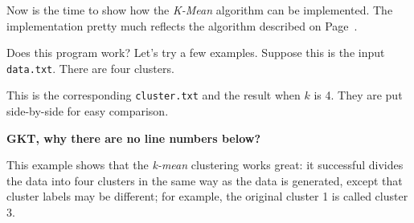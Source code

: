 Now is the time to show how the {\it K-Mean} algorithm can be
implemented. The implementation pretty much reflects the algorithm
described on Page~\pageref{algorithm:kmean}.

\resetlinenumber[1]
\linenumbers
\begin{tt}
  
\end{tt}
\nolinenumbers

\resetlinenumber[1]
\linenumbers
\begin{tt}
  
\end{tt}
\nolinenumbers

\resetlinenumber[1]
\linenumbers
\begin{tt}
  
\end{tt}
\nolinenumbers

\resetlinenumber[1]
\linenumbers
\begin{tt}
  
\end{tt}
\nolinenumbers


Does this program work? Let's try a few examples. Suppose this
is the input {\tt data.txt}. There are four clusters.

\resetlinenumber[1]
\linenumbers
\begin{tt}
  
\end{tt}
\nolinenumbers

This is the corresponding {\tt cluster.txt}
and the result when $k$ is 4. They are put side-by-side
for easy comparison.

{\bf GKT, why there are no line numbers below?}

\begin{minipage}[t]{0.4\textwidth}
\resetlinenumber[1]
\linenumbers
\begin{tt}
  
\end{tt}
\nolinenumbers
\end{minipage}
\begin{minipage}[t]{0.4\textwidth}
\resetlinenumber[1]
\linenumbers
\begin{tt}
  
\end{tt}
\nolinenumbers
\end{minipage}

This example shows that the {\it k-mean} clustering works great: it
successful divides the data into four clusters in the same way as the
data is generated, except that cluster labels may be different; for
example, the original cluster 1 is called cluster 3.

